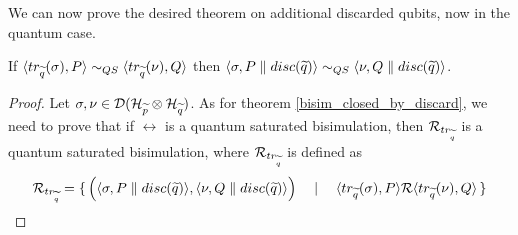 We can now prove the desired theorem on additional discarded qubits, now in the quantum case.

\begin{theorem}\label{bisim_closed_by_discard_quantum}
If $\langle tr_{\widetilde{q}}(\sigma), P\rangle \sim_{QS} \langle tr_{\widetilde{q}}(\nu), Q\rangle$ then $\langle\sigma, P \parallel disc(\widetilde{q})\rangle \sim_{QS} \langle\nu, Q \parallel disc(\widetilde{q})\rangle$.
\end{theorem}
\begin{proof}
Let $\sigma, \nu \in \mathcal{D}(\mathcal{H}_{\widetilde{p}} \otimes \mathcal{H}_{\widetilde{q}})$. As for theorem \ref{bisim_closed_by_discard}, we need to prove that  if $\rel$ is a quantum saturated bisimulation, then $\mathcal{R}_{tr_{\widetilde{q}}}$ is a quantum saturated bisimulation, where $\mathcal{R}_{tr_{\widetilde{q}}}$ is defined as
\[\mathcal{R}_{tr_{\widetilde{q}}} = \set{\Big(\langle\sigma, P \parallel disc(\widetilde{q})\rangle, \langle\nu, Q \parallel disc(\widetilde{q})\rangle\Big) \quad\mid\quad \langle tr_{\widetilde{q}}(\sigma), P\rangle \mathcal{R}\langle tr_{\widetilde{q}}(\nu), Q\rangle}\]


\end{proof}
